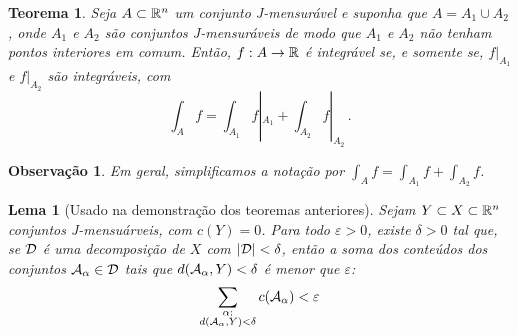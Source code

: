 \documentclass[a4paper,12pt]{extreport}
\newtheorem{myobs}[mydef]{Observação}
\newtheorem{myteo}[mydef]{Teorema}
\newtheorem{mylem}[mydef]{Lema}
\newif\ifspacesbetweentheos
\newcommand{\theospace}[1]{
\ifspacesbetweentheos
  \vspace{#1}
\fi
}
\newcommand{\theonewpage}{
\ifspacesbetweentheos
  \newpage
\fi
}
\begin{document}
\theospace{10cm}



\begin{myteo}
  Seja $A \subset \mathbb{R}^n$ um conjunto J-mensurável
  e suponha que $A = A_1 \cup A_2$,
  onde $A_1$ e $A_2$ são conjuntos J-mensuráveis
  de modo que $A_1$ e $A_2$ não tenham pontos interiores em comum.
  Então, $f:A \to \mathbb{R}$ é integrável se,
  e somente se,
  $f|_{A_1}$ e $f|_{A_2}$ são integráveis,
  com
  \begin{equation}
    \int_A f = \int_{A_1} f|_{A_1} + \int_{A_2} f|_{A_2}\,.
  \end{equation}
\end{myteo}


\begin{myobs}
  Em geral, simplificamos a notação por
  $\int_A f = \int_{A_1} f + \int_{A_2} f$.
\end{myobs}


\theonewpage


\begin{mylem}[Usado na demonstração dos teoremas anteriores]
  Sejam $Y \subset X \subset \mathbb{R}^n$ conjuntos J-mensuárveis,
  com $c(Y) = 0$.
  Para todo $\varepsilon > 0$,
  existe $\delta > 0$ tal que,
  se $\mathcal{D}$ é uma decomposição de $X$ com $|\mathcal{D}| < \delta$,
  então a soma dos conteúdos dos conjuntos $\mathcal{A}_\alpha \in \mathcal{D}$
  tais que $d(\mathcal{A}_\alpha, Y) < \delta$ é menor que $\varepsilon$:
  \begin{equation}
    \sum_{\substack{
        \alpha:\\
        d(\mathcal{A}_\alpha, Y) < \delta}
    }
    c(\mathcal{A}_\alpha) < \varepsilon
  \end{equation}
\end{mylem}



\theonewpage
\end{document}
